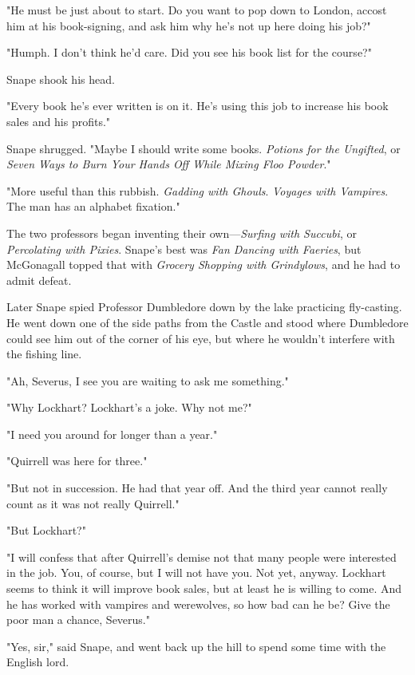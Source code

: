 "He must be just about to start. Do you want to pop down to London, accost him at his book-signing, and ask him why he's not up here doing his job?"

"Humph. I don't think he'd care. Did you see his book list for the course?"

Snape shook his head.

"Every book he's ever written is on it. He's using this job to increase his book sales and his profits."

Snape shrugged. "Maybe I should write some books. \emph{Potions for the Ungifted}, or \emph{Seven Ways to Burn Your Hands Off While Mixing Floo Powder}."

"More useful than this rubbish. \emph{Gadding with Ghouls}. \emph{Voyages with Vampires}. The man has an alphabet fixation."

The two professors began inventing their own—\emph{Surfing with Succubi}, or \emph{Percolating with Pixies}. Snape's best was \emph{Fan Dancing with Faeries}, but McGonagall topped that with \emph{Grocery Shopping with Grindylows}, and he had to admit defeat.

Later Snape spied Professor Dumbledore down by the lake practicing fly-casting. He went down one of the side paths from the Castle and stood where Dumbledore could see him out of the corner of his eye, but where he wouldn't interfere with the fishing line.

"Ah, Severus, I see you are waiting to ask me something."

"Why Lockhart? Lockhart's a joke. Why not me?"

"I need you around for longer than a year."

"Quirrell was here for three."

"But not in succession. He had that year off. And the third year cannot really count as it was not really Quirrell."

"But Lockhart?"

"I will confess that after Quirrell's demise not that many people were interested in the job. You, of course, but I will not have you. Not yet, anyway. Lockhart seems to think it will improve book sales, but at least he is willing to come. And he has worked with vampires and werewolves, so how bad can he be? Give the poor man a chance, Severus."

"Yes, sir," said Snape, and went back up the hill to spend some time with the English lord.

\sbreak

